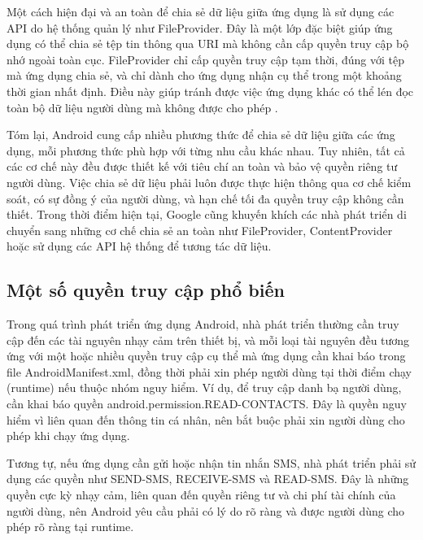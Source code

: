       Một cách hiện đại và an toàn để chia sẻ dữ liệu giữa ứng dụng là sử dụng các API do hệ thống quản lý như FileProvider. Đây là một lớp đặc biệt giúp ứng dụng có thể chia sẻ tệp tin thông qua URI mà không cần cấp quyền truy cập bộ nhớ ngoài toàn cục. FileProvider chỉ cấp quyền truy cập tạm thời, đúng với tệp mà ứng dụng chia sẻ, và chỉ dành cho ứng dụng nhận cụ thể trong một khoảng thời gian nhất định. Điều này giúp tránh được việc ứng dụng khác có thể lén đọc toàn bộ dữ liệu người dùng mà không được cho phép \cite{FileProvider}.

      \vspace{0.5em}

      Tóm lại, Android cung cấp nhiều phương thức để chia sẻ dữ liệu giữa các ứng dụng, mỗi phương thức phù hợp với từng nhu cầu khác nhau. Tuy nhiên, tất cả các cơ chế này đều được thiết kế với tiêu chí an toàn và bảo vệ quyền riêng tư người dùng. Việc chia sẻ dữ liệu phải luôn được thực hiện thông qua cơ chế kiểm soát, có sự đồng ý của người dùng, và hạn chế tối đa quyền truy cập không cần thiết. Trong thời điểm hiện tại, Google cũng khuyến khích các nhà phát triển di chuyển sang những cơ chế chia sẻ an toàn như FileProvider, ContentProvider hoặc sử dụng các API hệ thống để tương tác dữ liệu.

\subsection{Một số quyền truy cập phổ biến}

Trong quá trình phát triển ứng dụng Android, nhà phát triển thường cần truy cập đến các tài nguyên nhạy cảm trên thiết bị, và mỗi loại tài nguyên đều tương ứng với một hoặc nhiều quyền truy cập cụ thể mà ứng dụng cần khai báo trong file AndroidManifest.xml, đồng thời phải xin phép người dùng tại thời điểm chạy (runtime) nếu thuộc nhóm nguy hiểm. Ví dụ, để truy cập danh bạ người dùng, cần khai báo quyền android.permission.READ-CONTACTS. Đây là quyền nguy hiểm vì liên quan đến thông tin cá nhân, nên bắt buộc phải xin người dùng cho phép khi chạy ứng dụng.

\vspace{0.5em}

Tương tự, nếu ứng dụng cần gửi hoặc nhận tin nhắn SMS, nhà phát triển phải sử dụng các quyền như SEND-SMS, RECEIVE-SMS và READ-SMS. Đây là những quyền cực kỳ nhạy cảm, liên quan đến quyền riêng tư và chi phí tài chính của người dùng, nên Android yêu cầu phải có lý do rõ ràng và được người dùng cho phép rõ ràng tại runtime.

